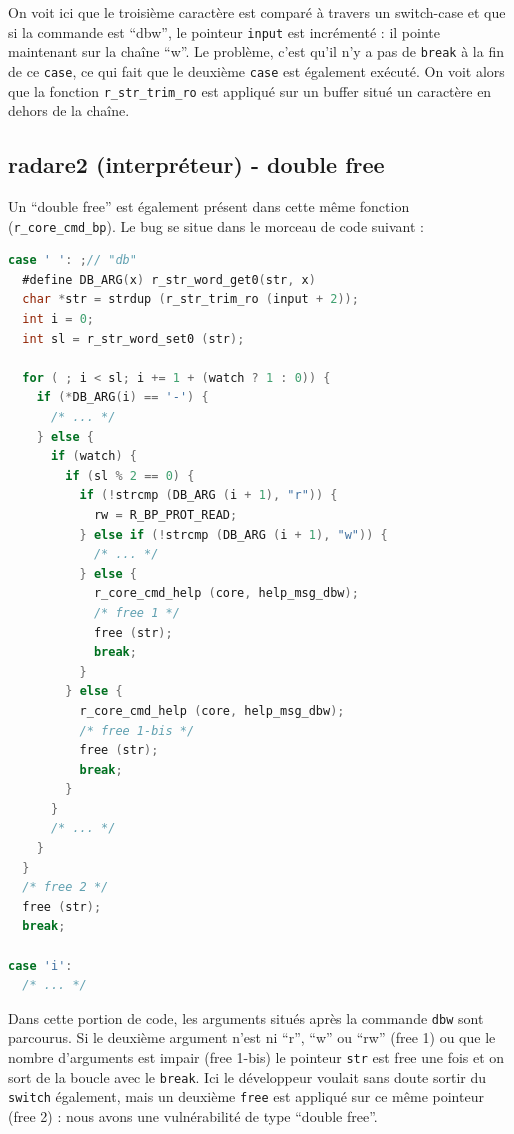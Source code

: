 On voit ici que le troisième caractère est comparé à travers un switch-case et que si la commande est ``dbw'', le pointeur \lstinline{input} est incrémenté : il pointe maintenant sur la chaîne ``w''.
Le problème, c'est qu'il n'y a pas de \lstinline{break} à la fin de ce \lstinline{case}, ce qui fait que le deuxième \lstinline{case} est également exécuté.
On voit alors que la fonction \lstinline{r_str_trim_ro} est appliqué sur un buffer situé un caractère en dehors de la chaîne.

\subsection{radare2 (interpréteur) - double free}

Un ``double free'' est également présent dans cette même fonction (\lstinline{r_core_cmd_bp}).
Le bug se situe dans le morceau de code suivant :

\begin{lstlisting}[language=C]
case ' ': ;// "db"
  #define DB_ARG(x) r_str_word_get0(str, x)
  char *str = strdup (r_str_trim_ro (input + 2));
  int i = 0;
  int sl = r_str_word_set0 (str);

  for ( ; i < sl; i += 1 + (watch ? 1 : 0)) {
    if (*DB_ARG(i) == '-') {
      /* ... */
    } else {
      if (watch) {
        if (sl % 2 == 0) {
          if (!strcmp (DB_ARG (i + 1), "r")) {
            rw = R_BP_PROT_READ;
          } else if (!strcmp (DB_ARG (i + 1), "w")) {
            /* ... */
          } else {
            r_core_cmd_help (core, help_msg_dbw);
            /* free 1 */
            free (str);
            break;
          }
        } else {
          r_core_cmd_help (core, help_msg_dbw);
          /* free 1-bis */
          free (str);
          break;
        }
      }
      /* ... */
    }
  }
  /* free 2 */
  free (str);
  break;

case 'i':
  /* ... */

\end{lstlisting}

Dans cette portion de code, les arguments situés après la commande \lstinline{dbw} sont parcourus.
Si le deuxième argument n'est ni ``r'', ``w'' ou ``rw'' (free 1) ou que le nombre d'arguments est impair (free 1-bis) le pointeur \lstinline{str} est free une fois et on sort de la boucle avec le \lstinline{break}.
Ici le développeur voulait sans doute sortir du \lstinline{switch} également, mais un deuxième \lstinline{free} est appliqué sur ce même pointeur (free 2) : nous avons une vulnérabilité de type ``double free''.


